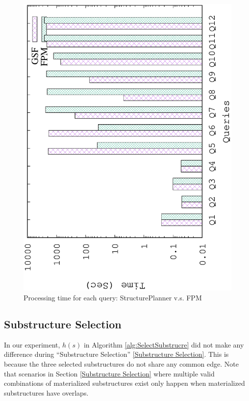 \begin{figure}[H]
\centering
\includegraphics[scale=0.5, angle=270]{plot/qfpm}
\caption{Processing time for each query: StructurePlanner v.s. FPM}
\label{fig:qfpm}
\end{figure}


\subsection{Substructure Selection}

In our experiment, $h(s)$ in Algorithm \ref{alg:SelectSubstrucre} did not make any difference during ``Substructure Selection'' \ref{Substructure Selection}. This is because the three selected substructures do not share any common edge. Note that scenarios in Section \ref{Substructure Selection} where multiple valid combinations of materialized substructures exist only happen when materialized substructures have overlaps. 

